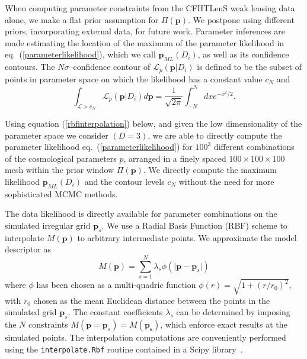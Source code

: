 \documentclass[reprint,aps,prd,superscriptaddress,showkeys,showpacs]{revtex4-1}
\begin{document}
When computing parameter constraints from the CFHTLenS weak lensing
data alone, we make a flat prior assumption for $\Pi(\mathbf{p})$.  We
postpone using different priors, incorporating external data, for
future work. Parameter inferences are made estimating the location of
the maximum of the parameter likelihood in
eq.~(\ref{parameterlikelihood}), which we call $\mathbf{p}_{ML}(D_i)$,
as well as its confidence contours. The $N\sigma$--confidence contour
of $\mathcal{L}_p(\mathbf{p}\vert D_i)$ is defined to be the subset of
points in parameter space on which the likelihood has a constant value
$c_N$ and
\begin{equation}
\label{ennesigma}
\int_{\mathcal{L}>c_N} \mathcal{L}_p(\mathbf{p}\vert D_i) d\mathbf{p} = \frac{1}{\sqrt{2\pi}}\int_{-N}^N dx e^{-x^2/2}.
\end{equation}
%

Using equation (\ref{rbfinterpolation}) below, and given the low
dimensionality of the parameter space we consider $(D=3)$, we are able
to directly compute the parameter likelihood
eq.~(\ref{parameterlikelihood}) for $100^3$ different combinations of
the cosmological parameters $p$, arranged in a finely spaced
$100\times100\times100$ mesh within the prior window
$\Pi(\mathbf{p})$. We directly compute the maximum likelihood
$\mathbf{p}_{ML}(D_i)$ and the contour levels $c_N$ without the need
for more sophisticated MCMC methods.

The data likelihood is directly available for parameter combinations
on the simulated irregular grid $\mathbf{p}_s$.  We use a Radial Basis
Function (RBF) scheme to interpolate $M(\mathbf{p})$ to arbitrary
intermediate points.  We approximate the model descriptor as
\begin{equation}
\label{rbfinterpolation}
M(\mathbf{p}) = \sum_{s=1}^N \lambda_s\phi(\vert\mathbf{p}-\mathbf{p}_s\vert)
\end{equation}
%
where $\phi$ has been chosen as a multi-quadric function
$\phi(r)=\sqrt{1+(r/r_0)^2}$, with $r_0$ chosen as the mean Euclidean
distance between the points in the simulated grid $\mathbf{p}_s$. The
constant coefficients $\lambda_s$ can be determined by imposing the
$N$ constraints $M(\mathbf{p}=\mathbf{p}_s)=M(\mathbf{p_s})$, which
enforce exact results at the simulated points. The interpolation
computations are conveniently performed using the
\texttt{interpolate.Rbf} routine contained in a Scipy library~\citep{scipy}.
\end{document}
